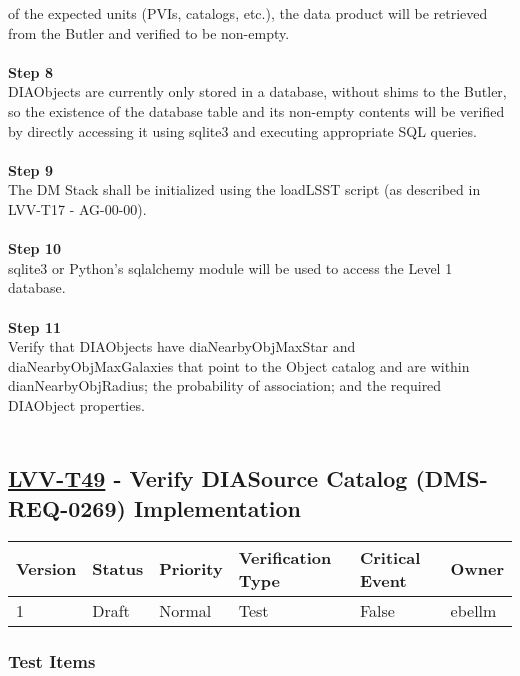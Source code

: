 of the expected units (PVIs, catalogs, etc.), the data product will be
retrieved from the Butler and verified to be non-empty.\\
~\\
\textbf{Step 8}\\
DIAObjects are currently only stored in a database, without shims to the
Butler, so the existence of the database table and its non-empty
contents will be verified by directly accessing it using sqlite3 and
executing appropriate SQL queries.\\
~\\
\textbf{Step 9}\\
The DM Stack shall be initialized using the loadLSST script (as
described in LVV-T17 - AG-00-00).\\
~\\
\textbf{Step 10}\\
sqlite3 or Python's sqlalchemy module will be used to access the Level 1
database.\\
~\\
\textbf{Step 11}\\
Verify that DIAObjects have diaNearbyObjMaxStar and
diaNearbyObjMaxGalaxies that point to the Object catalog and are within
dianNearbyObjRadius; the probability of association; and the required
DIAObject properties.\\
~\\

\hypertarget{lvv-t49---verify-diasource-catalog-dms-req-0269-implementation}{%
\subsection{\texorpdfstring{\href{https://jira.lsstcorp.org/secure/Tests.jspa\#/testCase/LVV-T49}{LVV-T49}
- Verify DIASource Catalog (DMS-REQ-0269)
Implementation}{LVV-T49 - Verify DIASource Catalog (DMS-REQ-0269) Implementation}}\label{lvv-t49---verify-diasource-catalog-dms-req-0269-implementation}}

\begin{longtable}[]{@{}llllll@{}}
\toprule
Version & Status & Priority & Verification Type & Critical Event &
Owner\tabularnewline
\midrule
\endhead
1 & Draft & Normal & Test & False & ebellm\tabularnewline
\bottomrule
\end{longtable}

\hypertarget{test-items-12}{%
\subsubsection{Test Items}\label{test-items-12}}

